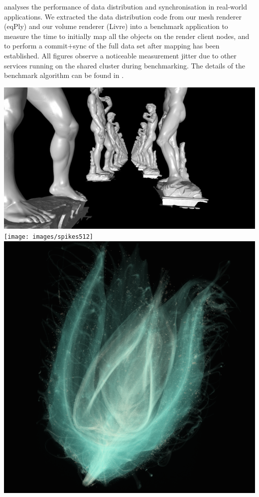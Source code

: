  analyses the performance of data distribution and
synchronisation in real-world applications. We extracted the data distribution
code from our mesh renderer (eqPly) and our volume renderer (Livre) into a
benchmark application to measure the time to initially map all the objects on
the render client nodes, and to perform a commit$+$sync of the full data set
after mapping has been established. All figures observe a noticeable
measurement jitter due to other services running on the shared cluster during
benchmarking. The details of the benchmark algorithm can be found in
\cite{ESP:18}.

\begin{benchmark}[h!t]\center
\includegraphics[height=.245\textwidth]{images/benchmark_eqPly2}\hfil
\texttt{[image: images/spikes512]}\hfil
\includegraphics[height=.245\textwidth]{images/beechnut}\vspace{1em}\\

\end{benchmark}
